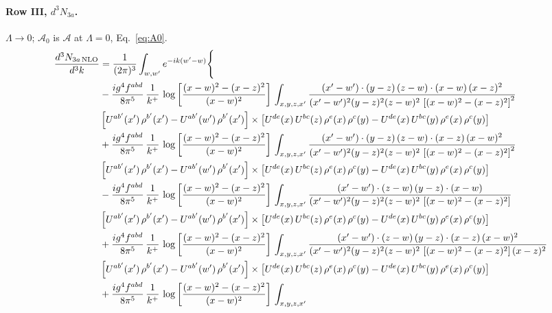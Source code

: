 \documentclass[10pt]{article}
\numberwithin{equation}{section}
\begin{document}
\paragraph{Row III, $d^3N_{3a}$.}
$\Lambda\to0$; $\mathcal A_0$ is $\mathcal A$ at $\Lambda=0$, Eq.~\eqref{eq:A0}.
\begin{align}
\frac{d^{3}N_{3a\,\rm NLO}}{d^{3}k} & = \frac{1}{(2\pi)^{3}}\int_{w,w'}e^{-ik(w'-w)}\Bigg\{\notag \\
&  
-\frac{ig^{4}f^{abd}}{8\pi^{5}}\,\frac{1}{k^{+}}\,\log{\left[\frac{(x-w)^{2}-(x-z)^{2}}{(x-w)^{2}}\right]}\,\int_{x,y,z,x'}
\frac{(x'-w')\cdot(y-z)\,(z-w)\cdot(x-w)\,(x-z)^{2}}{(x'-w')^{2}(y-z)^{2}(z-w)^{2}\,\left[(x-w)^{2}-(x-z)^{2}\right]^{2}}\notag \\ & \left[U^{ab'}(x')\,\rho^{b'}(x')-U^{ab'}(w')\, \rho^{b'}(x')\right]\times \left[U^{de}(x)\,U^{bc}(z)\, \rho^{e}(x)\,\rho^{c}(y)-U^{de}(x)\,U^{bc}(y)\,\rho^{e}(x)\,\rho^{c}(y)\right] \notag \\
& +\frac{ig^{4}f^{abd}}{8\pi^{5}}\,\frac{1}{k^{+}}\,\log{\left[\frac{(x-w)^{2}-(x-z)^{2}}{(x-w)^{2}}\right]}\,\int_{x,y,z,x'}
\frac{(x'-w')\cdot(y-z)\,(z-w)\cdot(x-z)\,(x-w)^{2}}{(x'-w')^{2}(y-z)^{2}(z-w)^{2}\,\left[(x-w)^{2}-(x-z)^{2}\right]^{2}}\notag \\ 
&\left[U^{ab'}(x')\,\rho^{b'}(x')-U^{ab'}(w')\, \rho^{b'}(x')\right]\times \left[U^{de}(x)\,U^{bc}(z)\, \rho^{e}(x)\,\rho^{c}(y)-U^{de}(x)\,U^{bc}(y)\,\rho^{e}(x)\,\rho^{c}(y)\right] \notag \\
& -\frac{ig^{4}f^{abd}}{8\pi^{5}}\,\frac{1}{k^{+}}\,\log{\left[\frac{(x-w)^{2}-(x-z)^{2}}{(x-w)^{2}}\right]}\,\int_{x,y,z,x'}
\frac{(x'-w')\cdot(z-w)\,(y-z)\cdot(x-w)}{(x'-w')^{2}(y-z)^{2}(z-w)^{2}\,\left[(x-w)^{2}-(x-z)^{2}\right]}\notag \\ & \left[U^{ab'}(x')\,\rho^{b'}(x')-U^{ab'}(w')\, \rho^{b'}(x')\right]\times \left[U^{de}(x)\,U^{bc}(z)\, \rho^{e}(x)\,\rho^{c}(y)-U^{de}(x)\,U^{bc}(y)\,\rho^{e}(x)\,\rho^{c}(y)\right] \notag \\
&  +\frac{ig^{4}f^{abd}}{8\pi^{5}}\,\frac{1}{k^{+}}\,\log{\left[\frac{(x-w)^{2}-(x-z)^{2}}{(x-w)^{2}}\right]}\,\int_{x,y,z,x'}
\frac{(x'-w')\cdot(z-w)\,(y-z)\cdot(x-z)\,(x-w)^{2}}{(x'-w')^{2}(y-z)^{2}(z-w)^{2}\,\left[(x-w)^{2}-(x-z)^{2}\right](x-z)^{2}}\notag \\ & \left[U^{ab'}(x')\,\rho^{b'}(x')-U^{ab'}(w')\, \rho^{b'}(x')\right]\times \left[U^{de}(x)\,U^{bc}(z)\, \rho^{e}(x)\,\rho^{c}(y)-U^{de}(x)\,U^{bc}(y)\,\rho^{e}(x)\,\rho^{c}(y)\right] \notag \\
& +\frac{ig^{4}f^{abd}}{8\pi^{5}}\,\frac{1}{k^{+}}\,\log{\left[\frac{(x-w)^{2}-(x-z)^{2}}{(x-w)^{2}}\right]}\,\int_{x,y,z,x'}

\end{align}
\end{document}
